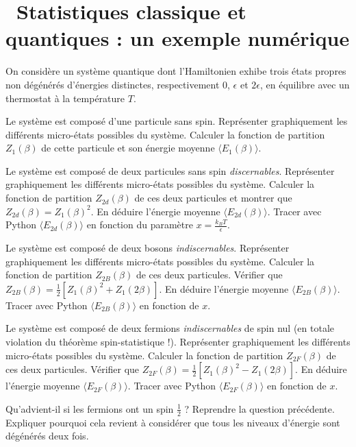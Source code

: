 \documentclass[utf8, 11pt]{feuille}
\begin{document}




\section{\medium~Statistiques classique et quantiques : un exemple numérique}

On considère un système quantique dont l'Hamiltonien exhibe trois états propres non dégénérés d'énergies distinctes, respectivement 0, $\epsilon$ et $2\epsilon$, en équilibre avec un thermostat à la température $T$.

\medskip

\question
Le système est composé d'une particule sans spin. Représenter graphiquement les différents micro-états possibles du système. Calculer la fonction de partition $Z_1(\beta)$ de cette particule et son énergie moyenne $\langle E_1 (\beta) \rangle$.

\question
Le système est composé de deux particules sans spin \textit{discernables}. Représenter graphiquement les différents micro-états possibles du système. Calculer la fonction de partition $Z_{2d}(\beta)$ de ces deux particules et montrer que  $Z_{2d}(\beta)=Z_1(\beta)^2$. En déduire l'énergie moyenne $\langle E_{2d}(\beta) \rangle$. Tracer avec Python $\langle E_{2d}(\beta) \rangle$ en fonction du paramètre $x=\frac{k_BT}{\epsilon}$. 

\question
Le système est composé de deux bosons \textit{indiscernables}. Représenter graphiquement les différents micro-états possibles du système. Calculer la fonction de partition $Z_{2B}(\beta)$ de ces deux particules. Vérifier que  $Z_{2B}(\beta)=\frac{1}{2} [Z_1(\beta)^2+Z_1(2\beta)]$. En déduire l'énergie moyenne $\langle E_{2B}(\beta) \rangle$. Tracer avec Python $\langle E_{2B}(\beta) \rangle$ en fonction de $x$. 

\question
Le système est composé de deux fermions \textit{indiscernables} de spin nul (en totale violation du théorème spin-statistique !). Représenter graphiquement les différents micro-états possibles du système. Calculer la fonction de partition $Z_{2F}(\beta)$ de ces deux particules. Vérifier que  $Z_{2F}(\beta)=\frac{1}{2} [Z_1(\beta)^2-Z_1(2\beta)]$. En déduire l'énergie moyenne $\langle E_{2F}(\beta) \rangle$. Tracer avec Python $\langle E_{2F}(\beta) \rangle$ en fonction de $x$. 

\question
Qu'advient-il si les fermions ont un spin $\frac{1}{2}$ ? Reprendre la question précédente. Expliquer pourquoi cela revient à considérer que tous les niveaux d'énergie sont dégénérés deux fois.
\end{document}
